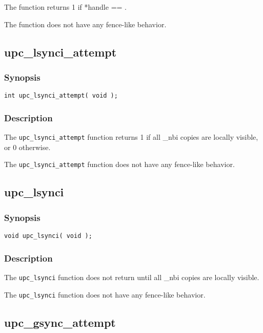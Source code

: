 \np The \function{} function returns 1 if *handle == \complete{}.

\np The \function{} function does not have any fence-like behavior.

\newpage
\subsection{upc\_lsynci\_attempt}
\def\function{{\tt upc\_lsynci\_attempt}}

\subsubsection{Synopsis}

\begin{verbatim}
int upc_lsynci_attempt( void );
\end{verbatim}

\subsubsection{Description}

\npf The \function{} function returns 1 if all \_nbi copies are
locally visible, or 0 otherwise.

\np The \function{} function does not have any fence-like behavior.

\subsection{upc\_lsynci}
\def\function{{\tt upc\_lsynci}}

\subsubsection{Synopsis}

\begin{verbatim}
void upc_lsynci( void );
\end{verbatim}

\subsubsection{Description}

\npf The \function{} function does not return until all \_nbi copies
are locally visible.

\np The \function{} function does not have any fence-like behavior.

\newpage
\subsection{upc\_gsync\_attempt}
\def\function{{\tt upc\_gsync\_attempt}}

